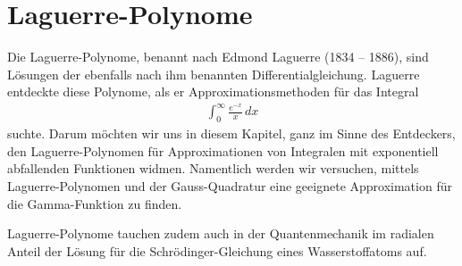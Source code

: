 %
%
%
\chapter{Laguerre-Polynome\label{chapter:laguerre}}
\begin{refsection}
%
%

{\parindent0pt Die} Laguerre\--Polynome,
benannt nach Edmond Laguerre (1834 -- 1886),
%
%
sind Lösungen der ebenfalls nach %
ihm
benannten Differentialgleichung.
Laguerre entdeckte diese Polynome, als er Appro\-xi\-ma\-tions\-methoden
für das Integral
\begin{align*}
\int_0^\infty \frac{e^{-x}}{x} \, dx
\end{align*}
suchte.
Darum möchten wir uns in diesem Kapitel,
ganz im Sinne des Entdeckers,
den Laguerre-Polynomen für Approximationen von Integralen mit
exponentiell abfallenden Funktionen widmen.
Namentlich werden wir versuchen, mittels Laguerre-Polynomen und
der Gauss-Quadratur eine geeignete Approximation für die Gamma-Funktion zu
%
%
finden.

Laguerre-Polynome tauchen zudem auch in der Quantenmechanik im radialen Anteil
der Lösung für die Schrödinger-Gleichung eines Wasserstoffatoms auf.
%
%





% 
% 

\printbibliography[heading=subbibliography]
\end{refsection}
